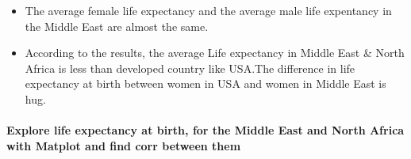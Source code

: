 \documentclass[11pt]{article}
\providecommand{\tightlist}{%
      \setlength{\itemsep}{0pt}\setlength{\parskip}{0pt}}
\begin{document}
\begin{itemize}
\tightlist
\item
  The average female life expectancy and the average male life
  expentancy in the Middle East are almost the same.
\end{itemize}

    \begin{itemize}
\tightlist
\item
  According to the results, the average Life expectancy in Middle East
  \& North Africa is less than developed country like USA.The difference
  in life expectancy at birth between women in USA and women in Middle
  East is hug.
\end{itemize}

\paragraph{Explore life expectancy at birth, for the Middle East and
North Africa with Matplot and find corr between
them}\label{explore-life-expectancy-at-birth-for-the-middle-east-and-north-africa-with-matplot-and-find-corr-between-them}
\end{document}
